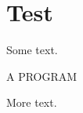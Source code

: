 \documentclass{article}
\begin{document}
\section{Test}
Some text.

\begin{program}
\centering A PROGRAM
\caption{A program caption}
\end{program}

More text.
\end{document}
